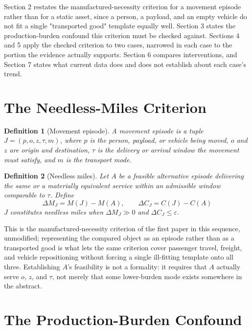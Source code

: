 \documentclass[11pt]{article}
\newtheorem{definition}{Definition}[section]
\begin{document}
Section 2 restates the manufactured-necessity criterion for a movement episode rather than for a static asset, since a person, a payload, and an empty vehicle do not fit a single "transported good" template equally well. Section 3 states the production-burden confound this criterion must be checked against. Sections 4 and 5 apply the checked criterion to two cases, narrowed in each case to the portion the evidence actually supports. Section 6 compares interventions, and Section 7 states what current data does and does not establish about each case's trend.

\section{The Needless-Miles Criterion}

\begin{definition}[Movement episode]
A movement episode is a tuple $J = (p, o, z, \tau, m)$, where $p$ is the person, payload, or vehicle being moved, $o$ and $z$ are origin and destination, $\tau$ is the delivery or arrival window the movement must satisfy, and $m$ is the transport mode.
\end{definition}

\begin{definition}[Needless miles]
Let $A$ be a feasible alternative episode delivering the same or a materially equivalent service within an admissible window comparable to $\tau$. Define
\[
\Delta M_J = M(J) - M(A), \qquad \Delta C_J = C(J) - C(A)
\]
$J$ constitutes needless miles when $\Delta M_J \gg 0$ and $\Delta C_J \leq \varepsilon$.
\end{definition}

This is the manufactured-necessity criterion of the first paper in this sequence, unmodified; representing the compared object as an episode rather than as a transported good is what lets the same criterion cover passenger travel, freight, and vehicle repositioning without forcing a single ill-fitting template onto all three. Establishing $A$'s feasibility is not a formality: it requires that $A$ actually serve $o$, $z$, and $\tau$, not merely that some lower-burden mode exists somewhere in the abstract.

\section{The Production-Burden Confound}
\end{document}
